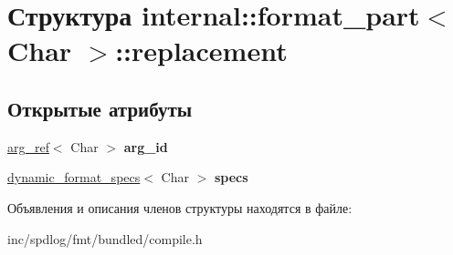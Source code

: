 \hypertarget{structinternal_1_1format__part_1_1replacement}{}\section{Структура internal\+:\+:format\+\_\+part$<$ Char $>$\+:\+:replacement}
\label{structinternal_1_1format__part_1_1replacement}
\subsection*{Открытые атрибуты}
\begin{DoxyCompactItemize}
\item 
\mbox{\label{structinternal_1_1format__part_1_1replacement_ad57444c7b2cabeb8abc65a7293deb7f9}} 
\hyperlink{structinternal_1_1arg__ref}{arg\+\_\+ref}$<$ Char $>$ {\bfseries arg\+\_\+id}
\item 
\mbox{\label{structinternal_1_1format__part_1_1replacement_ad3395552616a7e4b9b03aca8a287de07}} 
\hyperlink{structinternal_1_1dynamic__format__specs}{dynamic\+\_\+format\+\_\+specs}$<$ Char $>$ {\bfseries specs}
\end{DoxyCompactItemize}


Объявления и описания членов структуры находятся в файле\+:\begin{DoxyCompactItemize}
\item 
inc/spdlog/fmt/bundled/compile.\+h\end{DoxyCompactItemize}
